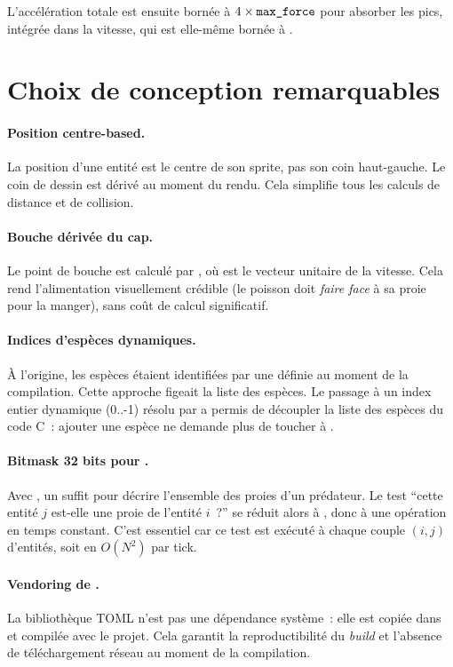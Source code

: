 L'accélération totale est ensuite bornée à
$4 \times \texttt{max\_force}$ pour absorber les pics, intégrée
dans la vitesse, qui est elle-même bornée à .

\section{Choix de conception remarquables}

\paragraph{Position centre-based.} La position d'une entité est
le centre de son sprite, pas son coin haut-gauche. Le coin de
dessin est dérivé au moment du rendu. Cela simplifie tous les
calculs de distance et de collision.

\paragraph{Bouche dérivée du cap.} Le point de bouche est
calculé par
, où
 est le vecteur unitaire de la vitesse. Cela rend
l'alimentation visuellement crédible (le poisson doit \emph{faire
face} à sa proie pour la manger), sans coût de calcul
significatif.

\paragraph{Indices d'espèces dynamiques.} À l'origine, les
espèces étaient identifiées par une 
définie au moment de la compilation. Cette approche figeait la
liste des espèces. Le passage à un index entier dynamique
(0..-1) résolu par
 a permis de découpler la liste des
espèces du code C~: ajouter une espèce ne demande plus de
toucher à .

\paragraph{Bitmask 32 bits pour .} Avec
, un  suffit pour décrire
l'ensemble des proies d'un prédateur. Le test
``cette entité $j$ est-elle une proie de l'entité $i$~?'' se
réduit alors à
, donc à une opération
en temps constant. C'est essentiel car ce test est exécuté à
chaque couple $(i, j)$ d'entités, soit en $O(N^2)$ par tick.

\paragraph{Vendoring de .} La bibliothèque TOML
n'est pas une dépendance système~: elle est copiée dans
 et compilée avec le projet. Cela
garantit la reproductibilité du \emph{build} et l'absence de
téléchargement réseau au moment de la compilation.
